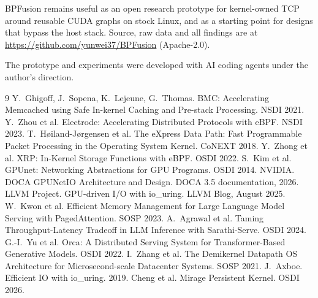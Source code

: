 \documentclass[sigconf,nonacm]{acmart}
\begin{document}
BPFusion remains useful as an open research prototype for kernel-owned TCP
around reusable CUDA graphs on stock Linux, and as a starting point for
designs that bypass the host stack. Source, raw data and all findings are at
\url{https://github.com/yunwei37/BPFusion} (Apache-2.0).

\begin{acks}
The prototype and experiments were developed with AI coding agents under the
author's direction.
\end{acks}

\begin{thebibliography}{9}
 Y.~Ghigoff, J.~Sopena, K.~Lejeune, G.~Thomas. BMC: Accelerating
Memcached using Safe In-kernel Caching and Pre-stack Processing. NSDI 2021.
 Y.~Zhou et al. Electrode: Accelerating Distributed
Protocols with eBPF. NSDI 2023.
 T.~H{\o}iland-J{\o}rgensen et al. The eXpress Data Path: Fast
Programmable Packet Processing in the Operating System Kernel. CoNEXT 2018.
 Y.~Zhong et al. XRP: In-Kernel Storage Functions with eBPF. OSDI
2022.
 S.~Kim et al. GPUnet: Networking Abstractions for GPU
Programs. OSDI 2014.
 NVIDIA. DOCA GPUNetIO Architecture and Design. DOCA 3.5
documentation, 2026.
 LLVM Project. GPU-driven I/O with io\_uring. LLVM Blog,
August 2025.
 W.~Kwon et al. Efficient Memory Management for Large Language
Model Serving with PagedAttention. SOSP 2023.
 A.~Agrawal et al. Taming Throughput-Latency Tradeoff in LLM
Inference with Sarathi-Serve. OSDI 2024.
 G.-I.~Yu et al. Orca: A Distributed Serving System for
Transformer-Based Generative Models. OSDI 2022.
 I.~Zhang et al. The Demikernel Datapath OS Architecture
for Microsecond-scale Datacenter Systems. SOSP 2021.
 J.~Axboe. Efficient IO with io\_uring. 2019.
 Cheng et al. Mirage Persistent Kernel. OSDI 2026.
\end{thebibliography}
\end{document}
